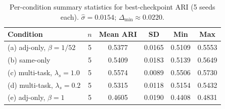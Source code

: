 \begin{table}[ht]
\centering
\caption{Per-condition summary statistics for best-checkpoint ARI (5 seeds each). $\hat{\sigma} = 0.0154$; $\Delta_{\min} \approx 0.0220$.} 
\label{tab:anova-summary}
\begin{tabular}{lccccc}
  \toprule
Condition & $n$ & Mean ARI & SD & Min & Max \\ 
  \midrule
(a) adj-only, $\beta=1/52$ &   5 & 0.5377 & 0.0165 & 0.5109 & 0.5553 \\ 
  (b) same-only &   5 & 0.5409 & 0.0183 & 0.5139 & 0.5649 \\ 
  (c) multi-task, $\lambda_s=1.0$ &   5 & 0.5574 & 0.0089 & 0.5506 & 0.5730 \\ 
  (d) multi-task, $\lambda_s=0.2$ &   5 & 0.5315 & 0.0118 & 0.5154 & 0.5432 \\ 
  (e) adj-only, $\beta=1$ &   5 & 0.4605 & 0.0190 & 0.4408 & 0.4831 \\ 
   \bottomrule
\end{tabular}
\end{table}
